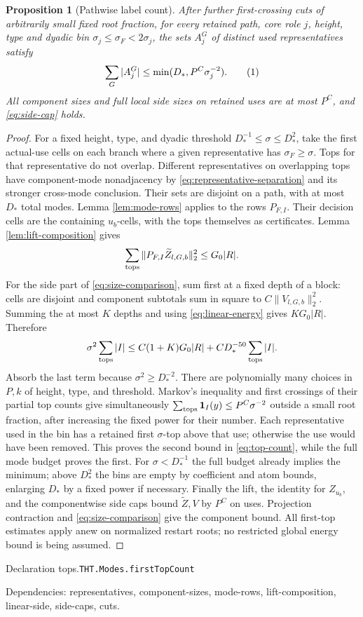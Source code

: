 \documentclass[11pt]{article}
\newtheorem{proposition}[theorem]{Proposition}
\theoremstyle{definition}
\newcommand{\one}{\mathbf 1}
\newcommand{\eqtag}[1]{\refstepcounter{equation}\tag{\theequation}\label{#1}}
\numberwithin{equation}{section}
\newcommand{\bp}[3]{\par\smallskip\begingroup\footnotesize
\noindent\hypertarget{bp:#1}{\textsf{Declaration #1.}}\quad\nolinkurl{#2}\par
\noindent\textsf{Dependencies:} #3.\par\endgroup\smallskip}
\begin{document}
\begin{proposition}[Pathwise label count]\label{prop:tops}
After further first-crossing cuts of arbitrarily small fixed root fraction, for every retained path, core role $j$, height, type and dyadic bin $\sigma_j\le\sigma_F<2\sigma_j$, the sets $A_j^G$ of distinct used representatives satisfy
\[
 \sum_G|A_j^G|\le\min(D_*,P^C\sigma_j^{-2}).
 \eqtag{eq:top-count}
\]
All component sizes and full local side sizes on retained uses are at most $P^C$, and \eqref{eq:side-cap} holds.
\end{proposition}
\begin{proof}
For a fixed height, type, and dyadic threshold $D_*^{-1}\le\sigma\le D_*^2$, take the first actual-use cells on each branch where a given representative has $\sigma_F\ge\sigma$. Tops for that representative do not overlap. Different representatives on overlapping tops have component-mode nonadjacency by \eqref{eq:representative-separation} and its stronger cross-mode conclusion. Their sets are disjoint on a path, with at most $D_*$ total modes. Lemma \ref{lem:mode-rows} applies to the rows $P_{F,I}$. Their decision cells are the containing $u_b$-cells, with the tops themselves as certificates. Lemma \ref{lem:lift-composition} gives
\[
 \sum_{\rm tops}\|P_{F,I}\widetilde Z_{l,G,b}\|_2^2\le G_0|R|.
\]
For the side part of \eqref{eq:size-comparison}, sum first at a fixed depth of a block: cells are disjoint and component subtotals sum in square to $C\|V_{l,G,b}\|_2^2$. Summing the at most $K$ depths and using \eqref{eq:linear-energy} gives $KG_0|R|$. Therefore
\[
 \sigma^2\sum_{\rm tops}|I|\le C(1+K)G_0|R|+CD_*^{-50}\sum_{\rm tops}|I|.
\]
Absorb the last term because $\sigma^2\ge D_*^{-2}$. There are polynomially many choices in $P,k$ of height, type, and threshold. Markov's inequality and first crossings of their partial top counts give simultaneously $\sum_{\rm tops}\one_I(y)\le P^C\sigma^{-2}$ outside a small root fraction, after increasing the fixed power for their number. Each representative used in the bin has a retained first $\sigma$-top above that use; otherwise the use would have been removed. This proves the second bound in \eqref{eq:top-count}, while the full mode budget proves the first. For $\sigma<D_*^{-1}$ the full budget already implies the minimum; above $D_*^2$ the bins are empty by coefficient and atom bounds, enlarging $D_*$ by a fixed power if necessary. Finally the lift, the identity for $Z_{u_b}$, and the componentwise side caps bound $\widetilde Z,V$ by $P^C$ on uses. Projection contraction and \eqref{eq:size-comparison} give the component bound. All first-top estimates apply anew on normalized restart roots; no restricted global energy bound is being assumed.
\end{proof}
\bp{tops}{THT.Modes.firstTopCount}{representatives, component-sizes, mode-rows, lift-composition, linear-side, side-caps, cuts}
\end{document}
